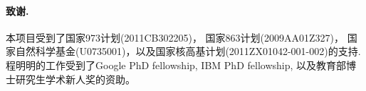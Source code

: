 \documentclass[final]{cvpr}
\begin{document}
\paragraph{致谢.} 本项目受到了国家973计划(2011CB302205)， 国家863计划(2009AA01Z327)，
国家自然科学基金(U0735001)，以及国家核高基计划(2011ZX01042-001-002)的支持.
程明明的工作受到了Google PhD fellowship, IBM PhD fellowship, 以及教育部博士研究生学术新人奖的资助。

{\small


}

\end{document}
